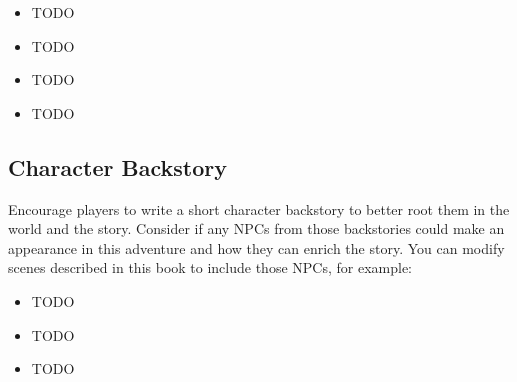 \begin{itemize}
	\item TODO
	\item TODO
	\item TODO
	\item TODO
\end{itemize}

\newpage
\subsection{Character Backstory}

Encourage players to write a short character backstory to better root them in the world and the story. Consider if any NPCs from those backstories could make an appearance in this adventure and how they can enrich the story. You can modify scenes described in this book to include those NPCs, for example:
\begin{itemize}
	\item TODO
	\item TODO
	\item TODO
\end{itemize}


